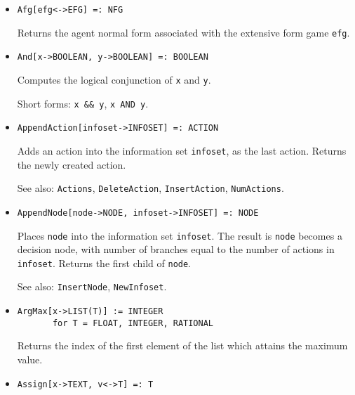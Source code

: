 \begin{itemize}
\item
\protect \large \begin{verbatim}
Afg[efg<->EFG] =: NFG
\end{verbatim}\normalsize

\bd
Returns the agent normal form associated with the extensive form game
\verb+efg+.
\ed


\item 
\protect \large \begin{verbatim}
And[x->BOOLEAN, y->BOOLEAN] =: BOOLEAN
\end{verbatim} \normalsize

\bd
Computes the logical conjunction of \verb+x+ and \verb+y+.
\item
[Short forms:] \verb+x && y+, \verb+x AND y+.
\ed


\item
\protect \large \begin{verbatim}
AppendAction[infoset->INFOSET] =: ACTION
\end{verbatim}\normalsize

\bd
Adds an action into the information set \verb+infoset+,
as the last action.  Returns the newly created action.
\item
[See also:] {\tt Actions}, {\tt DeleteAction}, {\tt InsertAction},
{\tt NumActions}.
\ed


\item
\protect \large \begin{verbatim} 
AppendNode[node->NODE, infoset->INFOSET] =: NODE
\end{verbatim}\normalsize

\bd
Places \verb+node+ into the information set
\verb+infoset+.  The result is \verb+node+ becomes a decision node,
with number of branches equal to the number of actions in \verb+infoset+.
Returns the first child of \verb+node+.
\item
[See also:] {\tt InsertNode}, {\tt NewInfoset}.
\ed


\item 
\protect \large \begin{verbatim}
ArgMax[x->LIST(T)] := INTEGER
       for T = FLOAT, INTEGER, RATIONAL
\end{verbatim} \normalsize

\bd
Returns the index of the first element of the list which attains the
maximum value. 
\ed

\item 
\protect \large \begin{verbatim}
Assign[x->TEXT, v<->T] =: T
\end{verbatim} \normalsize


\end{itemize}
